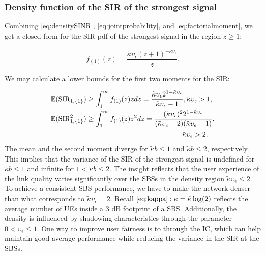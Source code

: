 \documentclass[lettersize,journal]{IEEEtran}
\begin{document}
\subsubsection{Density function of the SIR of the strongest signal}
Combining \eqref{eq:densitySINR}, \eqref{eq:jointprobability}, and \eqref{eq:factorialmoment}, we get a closed form for the SIR pdf of the strongest signal in the region $z\geq 1$:


\begin{equation}
  \label{eq:SIR1}
  f_{(1)}(z) = \frac {\tilde{\kappa}\upsilon_{\epsilon}\left({z + 1} \right)^{-\tilde{\kappa}\upsilon_{\epsilon}}} {z}.
\end{equation}



We may calculate a lower bounds for the first two moments for the SIR:


\begin{align}
  &\mathbb{E}(\text{SIR}_{1,\{1\}})  \geq\int_{1}^{\infty}f_{(1)}(z)zdz=\frac{\tilde{\kappa}\upsilon_{\epsilon}2^{1-\tilde{\kappa}\upsilon_{\epsilon} }}{\tilde{\kappa}\upsilon_{\epsilon}-1}, \tilde{\kappa}\upsilon_{\epsilon} >1, \\
  &\mathbb{E}(\text{SIR}^2_{1,\{1\}}) \geq \int_{1}^{\infty}f_{(1)}(z)z^2dz = \frac{(\tilde{\kappa}\upsilon_{\epsilon}) ^2 2^{1-\tilde{\kappa}\upsilon_{\epsilon} }}{(\tilde{\kappa}\upsilon_{\epsilon} - 2)  (\tilde{\kappa}\upsilon_{\epsilon} - 1)}, \nonumber\\
  &\hspace{6.5cm}\tilde{\kappa}\upsilon_{\epsilon}>2 .
\end{align}
The mean and the second moment diverge for $\tilde{\kappa}b\leq 1$ and $\tilde{\kappa}b\leq 2$, respectively. This implies that the variance of the SIR of the strongest signal is undefined for $\tilde{\kappa}b \leq 1$ and infinite for $1 <\tilde{\kappa}b \leq 2$. The insight reflects that the user experience of the link quality varies significantly over the SBSs in the density region $\tilde{\kappa} \upsilon_{\epsilon} \leq 2$. To achieve a consistent SBS performance, we have to make the network denser than what corresponds to $\tilde{\kappa} \upsilon_{\epsilon} =2$. Recall $\eqref{eq:kappa}: \kappa = \tilde{\kappa}\log(2)$ reflects the average number of UEs inside a $3$ dB footprint of a SBS.  Additionally, the density is influenced by shadowing characteristics through the parameter  $0<\upsilon_{\epsilon} \leq 1$. One way to improve user fairness is to through the IC, which can help maintain good average performance while reducing the variance in the SIR at the SBSs.
\end{document}
